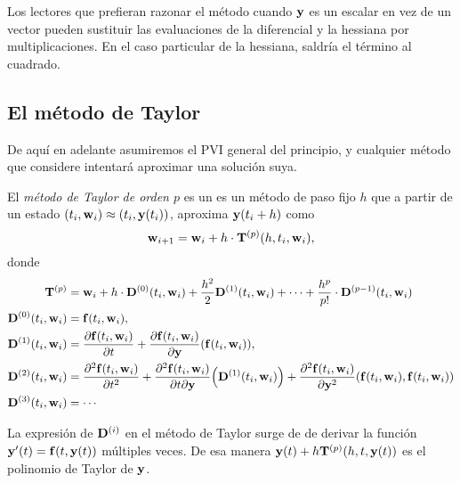 Los lectores que prefieran razonar el método
cuando $\vb{y}{}$ es un escalar en vez de un vector
pueden sustituir las evaluaciones de la diferencial y la hessiana
por multiplicaciones.
En el caso particular de la hessiana, saldría el término al cuadrado.

\subsection{El método de Taylor}
 
De aquí en adelante asumiremos el PVI general del principio,
y cualquier método que considere intentará aproximar una solución suya.

\begin{method}\label{met:taylor}
    \newcommand{\D}{\vb{D}}

    El \emph{método de Taylor de orden $p$} es un es un método de paso fijo $h$
    que a partir de un estado $(t_i, \vb{w}{}_i) \approx (t_i, \vb{y}{}(t_i))$,
    aproxima $\vb{y}{}(t_i + h)$ como
    \begin{equation*}
        \vb{w}{}_{i+1} =
        \vb{w}{}_i + h\cdot \vb{T}^{(p)}(h, t_i, \vb{w}{}_i),
    \end{equation*}
    donde
    \begin{align*}
        \vb{T}^{(p)} &=
            \vw_i + h\cdot \D^{(0)}(t_i, \vw_i)
            + \frac{h^2}{2}\D^{(1)}(t_i, \vw_i)
            + \cdots
            + \frac{h^p}{p!}\cdot \D^{(p-1)}(t_i, \vw_i) \\
        \D^{(0)}(t_i, \vw_i) &= \vf(t_i, \vw_i), \\
        \D^{(1)}(t_i, \vw_i) &=
            \pdv{\vf(t_i, \vw_i)}{t} +
            \pdv{\vf(t_i, \vw_i)}{\vy}\qty(\vf(t_i, \vw_i)), \\
        \D^{(2)}(t_i, \vw_i) &=
            \pdv[2]{\vf(t_i, \vw_i)}{t} +
            \pdv{\vf(t_i, \vw_i)}{t}{\vy}\qty(\D^{(1)}(t_i, \vw_i)) +
            \pdv[2]{\vf(t_i, \vw_i)}{\vy}\qty(
                \vf(t_i, \vw_i), \vf(t_i, \vw_i)
            ) \\
        \D^{(3)}(t_i, \vw_i) &= \cdots
    \end{align*}
\end{method}

\begin{remark}
    La expresión de $\vb{D}^{(i)}$ en el método de Taylor surge
    de de derivar la función $\vb{y}{}'(t) = \vb{f}{}(t, \vb{y}{}(t))$ múltiples veces.
    De esa manera $\vb{y}{}(t) + h\vb{T}^{(p)}(h, t, \vb{y}{}(t))$ es el
    polinomio de Taylor de $\vb{y}{}$.
\end{remark}

